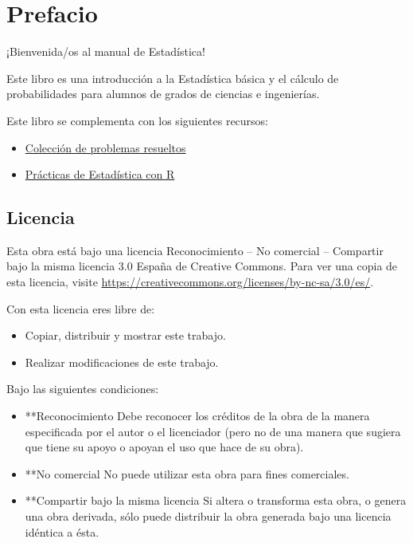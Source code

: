 \documentclass[
  a4paper,
]{scrreport}
\providecommand{\tightlist}{%
  \setlength{\itemsep}{0pt}\setlength{\parskip}{0pt}}\usepackage{longtable,booktabs,array}
\renewcommand*\contentsname{Indice de contenidos}
\newcommand\contentsname{Indice de contenidos}
\theoremstyle{definition}
\theoremstyle{definition}
\theoremstyle{plain}
\theoremstyle{remark}
\begin{document}
\renewcommand*\contentsname{Indice de contenidos}
{
\hypersetup{linkcolor=}
\setcounter{tocdepth}{2}
\tableofcontents
}

\hypertarget{prefacio}{%
\chapter*{Prefacio}\label{prefacio}}


¡Bienvenida/os al manual de Estadística!

Este libro es una introducción a la Estadística básica y el cálculo de
probabilidades para alumnos de grados de ciencias e ingenierías.

Este libro se complementa con los siguientes recursos:

\begin{itemize}
\tightlist
\item
  \href{https://aprendeconalf.es/estadistica-ejercicios/}{Colección de
  problemas resueltos}
\item
  \href{https://aprendeconalf.es/estadistica-practicas-r/}{Prácticas de
  Estadística con R}
\end{itemize}

\hypertarget{licencia}{%
\section*{Licencia}\label{licencia}}


Esta obra está bajo una licencia Reconocimiento -- No comercial --
Compartir bajo la misma licencia 3.0 España de Creative Commons. Para
ver una copia de esta licencia, visite
\url{https://creativecommons.org/licenses/by-nc-sa/3.0/es/}.

Con esta licencia eres libre de:

\begin{itemize}
\tightlist
\item
  Copiar, distribuir y mostrar este trabajo.
\item
  Realizar modificaciones de este trabajo.
\end{itemize}

Bajo las siguientes condiciones:

\begin{itemize}
\item
  **Reconocimiento Debe reconocer los créditos de la obra de la manera
  especificada por el autor o el licenciador (pero no de una manera que
  sugiera que tiene su apoyo o apoyan el uso que hace de su obra).
\item
  **No comercial No puede utilizar esta obra para fines comerciales.
\item
  **Compartir bajo la misma licencia Si altera o transforma esta obra, o
  genera una obra derivada, sólo puede distribuir la obra generada bajo
  una licencia idéntica a ésta.
\end{itemize}
\end{document}
